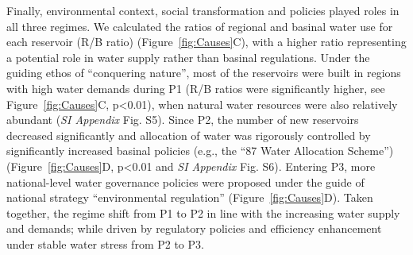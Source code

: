 Finally, environmental context, social transformation and policies played roles in all three regimes.
We calculated the ratios of regional and basinal water use for each reservoir (R/B ratio) (Figure~\ref{fig:Causes}C), with a higher ratio representing a potential role in water supply rather than basinal regulations.
Under the guiding ethos of ``conquering nature'', most of the reservoirs were built in regions with high water demands during P1 (R/B ratios were significantly higher, see Figure~\ref{fig:Causes}C, p<0.01), when natural water resources were also relatively abundant (\textit{SI Appendix} Fig. S5).
Since P2, the number of new reservoirs decreased significantly and allocation of water was rigorously controlled by significantly increased basinal policies (e.g., the ``87 Water Allocation Scheme'') (Figure~\ref{fig:Causes}D, p<0.01 and \textit{SI Appendix} Fig. S6).
Entering P3, more national-level water governance policies were proposed under the guide of national strategy ``environmental regulation'' (Figure~\ref{fig:Causes}D).
Taken together, the regime shift from P1 to P2 in line with the increasing water supply and demands; while driven by regulatory policies and efficiency enhancement under stable water stress from P2 to P3.
